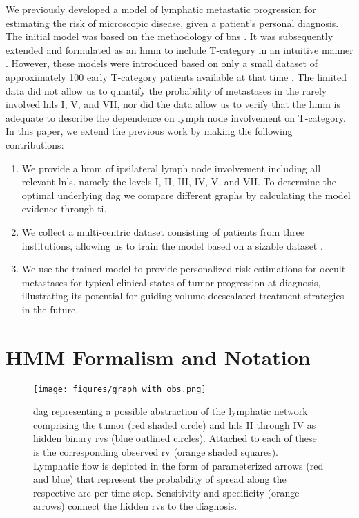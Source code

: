 \documentclass[twocolumn]{aastex631}
\begin{document}
We previously developed a model of lymphatic metastatic progression for estimating the risk of microscopic disease, given a patient's personal diagnosis. The initial model was based on the methodology of \glspl{bn} \citep{pouymayou_bayesian_2019}. It was subsequently extended and formulated as an \gls{hmm} to include T-category in an intuitive manner \citep{ludwig_hidden_2021}. However, these models were introduced based on only a small dataset of approximately 100 early T-category patients available at that time \citep{sanguineti_defining_2009}. The limited data did not allow us to quantify the probability of metastases in the rarely involved \glspl{lnl} I, V, and VII, nor did the data allow us to verify that the \gls{hmm} is adequate to describe the dependence on lymph node involvement on T-category. In this paper, we extend the previous work \citep{ludwig_hidden_2021} by making the following contributions:
\begin{enumerate}
    \item We provide a \gls{hmm} of ipsilateral lymph node involvement including all relevant \glspl{lnl}, namely the levels I, II, III, IV, V, and VII. To determine the optimal underlying \gls{dag} we compare different graphs by calculating the model evidence through \gls{ti}.
    \item We collect a multi-centric dataset consisting of patients from three institutions, allowing us to train the model based on a sizable dataset \citep{ludwig_dataset_2022,ludwig_multi-centric_2023}.
    \item We use the trained model to provide personalized risk estimations for occult metastases for typical clinical states of tumor progression at diagnosis, illustrating its potential for guiding volume-deescalated treatment strategies in the future. 
\end{enumerate}



\section{HMM Formalism and Notation}
\label{sec:formalism}


\begin{figure}
    \centering
    \texttt{[image: figures/graph\_with\_obs.png]}
    \caption{\Gls{dag} representing a possible abstraction of the lymphatic network comprising the tumor (red shaded circle) and \glspl{lnl} II through IV as hidden binary \glspl{rv} (blue outlined circles). Attached to each of these is the corresponding observed \gls{rv} (orange shaded squares). Lymphatic flow is depicted in the form of parameterized arrows (red and blue) that represent the probability of spread along the respective arc per time-step. Sensitivity and specificity (orange arrows) connect the hidden \glspl{rv} to the diagnosis. \label{fig:graph_with_obs}}
\end{figure}
\end{document}
